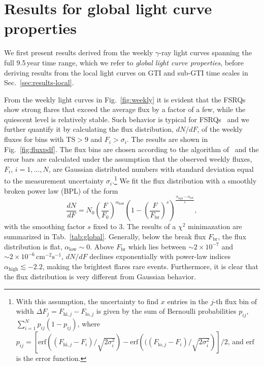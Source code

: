 \documentclass[twocolumn]{aastex62}
\newcommand{\gray}{$\gamma$-ray\xspace}
\begin{document}
\section{Results for global light curve properties}
\label{sec:results-global}
We first present results derived from the weekly \gray light curves spanning the full 9.5\,year time range, which we refer to \emph{global light curve properties}, before deriving results from the local light curves on GTI and sub-GTI time scales in Sec.~\ref{sec:results-local}.

From the weekly light curves in Fig.~\ref{fig:weekly} it is evident that the FSRQs show strong flares that exceed the average flux by a factor of a few, while the quiescent level is relatively stable. 
Such behavior is typical for FSRQs~\citet{} and we 
further quantify it by calculating the flux distribution, $dN/dF$, of the weekly fluxes for bins with $\mathrm{TS} > 9$ and $F_i > \sigma_i$. 
The results are shown in Fig.~\ref{fig:fluxpdf}. The flux bins are chosen according to the algorithm of~\citet{knuth2006} and the error bars are calculated under the assumption that the observed weekly fluxes, $F_i$, $i = 1,\ldots,N$, are Gaussian distributed numbers with standard deviation equal to the measurement uncertainty $\sigma_i$.\footnote{
With this assumption, the uncertainty to find $x$ entries in the $j$-th flux bin of width $\Delta F_j = F_{\mathrm{hi},j} - F_{\mathrm{lo},j}$ is given by the sum of Bernoulli probabilities $p_{ij}$, $\sum_{i = 1}^N p_{ij}(1-p_{ij})$, where $p_{ij} =  \left[\mathrm{erf}\left((F_{\mathrm{hi},j} - F_i) / \sqrt{2\sigma_i^2}\right) - \mathrm{erf}\left(((F_{\mathrm{lo},j} - F_i) / \sqrt{2\sigma_i^2}\right)\right]/2$, and $\mathrm{erf}$ is the error function.
}
We fit the flux distribution with a smoothly broken power law (BPL) of the form 
\begin{equation}
    \frac{dN}{dF} = N_0 \left( \frac{F}{F_0}\right)^{\alpha_\mathrm{low}}
        \left( 1 - \left(\frac{F}{F_\mathrm{br}}\right)^s \right)^{\frac{\alpha_\mathrm{high} - \alpha_\mathrm{low}}{s}},
        \label{eq:dndf}
\end{equation}
with the smoothing factor $s$ fixed to 3. 
The results of a $\chi^2$ minimazation are summarized in Tab.~\ref{tab:global}.
Generally, below the break flux $F_\mathrm{br}$, the flux distribution is flat, $\alpha_\mathrm{low}\sim 0$.
Above $F_\mathrm{br}$ which lies between $\sim2\times10^{-7}$ and $\sim2\times10^{-6}\,\mathrm{cm}^{-2}\mathrm{s}^{-1}$, $dN/dF$ declines exponentially with power-law indices $\alpha_\mathrm{high} \lesssim -2.2$, making the brightest flares rare events.
Furthermore, it is clear that the flux distribution is very different from Gaussian behavior. 
\end{document}
